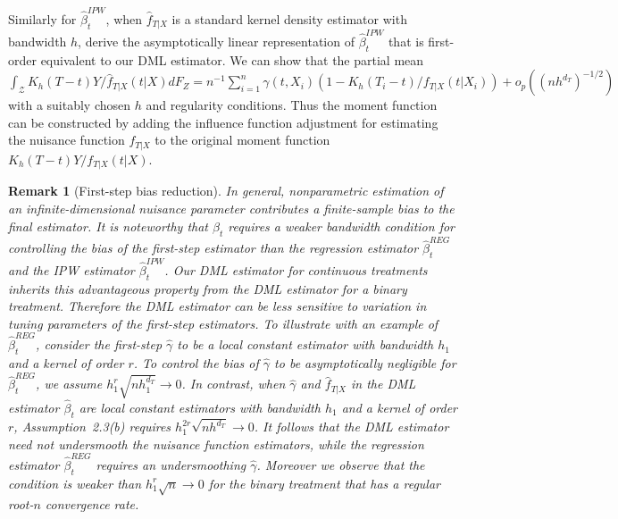 \documentclass[lettersize, 12pt]{article}
\newtheorem{remark}{Remark}
\begin{document}
{Similarly for $\hat \beta^{IPW}_t$, when $\hat f_{T|X}$ is a standard kernel density estimator with bandwidth $h$, \cite{HHLP} derive the asymptotically linear representation of $\hat \beta^{IPW}_t$ that is first-order equivalent to our DML estimator.
We can show that the partial mean $\int_\mathcal{Z} K_h(T-t) Y/\hat f_{T|X}(t|X) dF_{Z} = n^{-1}\sum_{i=1}^n \gamma(t, X_i)\left(1 - K_h(T_i - t)/f_{T|X}(t|X_i) \right) + o_p((nh^{d_T})^{-1/2})$ with a suitably chosen $h$ and regularity conditions.
Thus the moment function
can be constructed by adding the influence function adjustment for estimating 
the nuisance function $f_{T|X}$ to the original moment function $K_h(T-t) Y/f_{T|X}(t|X)$.

\begin{remark}[First-step bias reduction]{\rm
In general, nonparametric estimation of an infinite-dimensional nuisance parameter contributes a finite-sample bias to the final estimator.
It is noteworthy that 
$\hat \beta_t$ requires a weaker bandwidth condition for controlling the bias of the first-step estimator than the regression estimator $\hat \beta^{REG}_t$ and the IPW estimator $\hat \beta^{IPW}_t$.
Our DML estimator for continuous treatments inherits this advantageous property from the DML estimator for a binary treatment.
Therefore the DML estimator can be less sensitive to variation in tuning parameters of the first-step estimators.
To illustrate with an example of $\hat \beta^{REG}_t$, consider the first-step $\hat \gamma$ to be a local constant estimator with bandwidth $h_1$ and a kernel of order $r$. 
To control the bias of $\hat \gamma$ to be asymptotically negligible for $\hat \beta^{REG}_t$, we assume $h_1^r \sqrt{nh_1^{d_T}} \rightarrow 0$.
In contrast, when $\hat \gamma$ and $\hat f_{T|X}$ in the DML estimator $\hat \beta_t$ 
are local constant estimators with bandwidth $h_1$ and a kernel of order $r$, Assumption~2.3(b) requires $h_1^{2r}\sqrt{nh^{d_T}}\rightarrow 0$.
It follows that the DML estimator need not undersmooth the nuisance function estimators, while the regression estimator $\hat \beta^{REG}_t$ requires an undersmoothing $\hat \gamma$.
Moreover we observe that the condition is weaker than $h_1^r\sqrt{n} \rightarrow 0$ for the binary treatment that has a regular root-$n$ convergence rate.
}
\end{remark}



}
\end{document}
